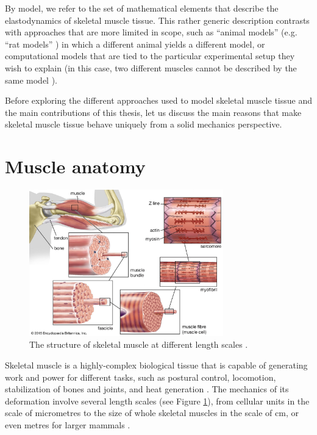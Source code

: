 \documentclass{sfuthesis}
\numberwithin{equation}{section}
\numberwithin{figure}{chapter}
\numberwithin{table}{chapter}
\theoremstyle{definition}
\begin{document}
By model, we refer to the set of mathematical elements that describe the elastodynamics of skeletal muscle tissue.
This rather generic description contrasts with approaches that are more limited in scope, such as ``animal models'' (e.g. ``rat models'' \cite{Passipieri2017,Wu2012}) in which a different animal yields a different model, or computational models that are tied to the particular experimental setup they wish to explain (in this case, two different muscles cannot be described by the same model \cite{Caillet2023,ValeroCuevas2009}).

Before exploring the different approaches used to model skeletal muscle tissue and the main contributions of this thesis, let us discuss the main reasons that make skeletal muscle tissue behave uniquely from a solid mechanics perspective.

\section{Muscle anatomy}

\begin{figure}
    \centering
    \includegraphics[width=0.75\textwidth]{figs/muscle-anatomy.jpg}
    \caption{The structure of skeletal muscle at different length scales \cite{MusclePicture}.}
    \label{fig:muscle_anatomy}
\end{figure}

Skeletal muscle is a highly-complex biological tissue that is capable of generating work and power for different tasks, such as postural control, locomotion, stabilization of bones and joints, and heat generation \cite{HillFirstLast1970,Lieber2010Book}.
The mechanics of its deformation involve several length scales (see Figure \ref{fig:muscle_anatomy}), from cellular units in the scale of micrometres to the size of whole skeletal muscles in the scale of cm, or even metres for larger mammals \cite{Lieber2010Book}.
\end{document}
